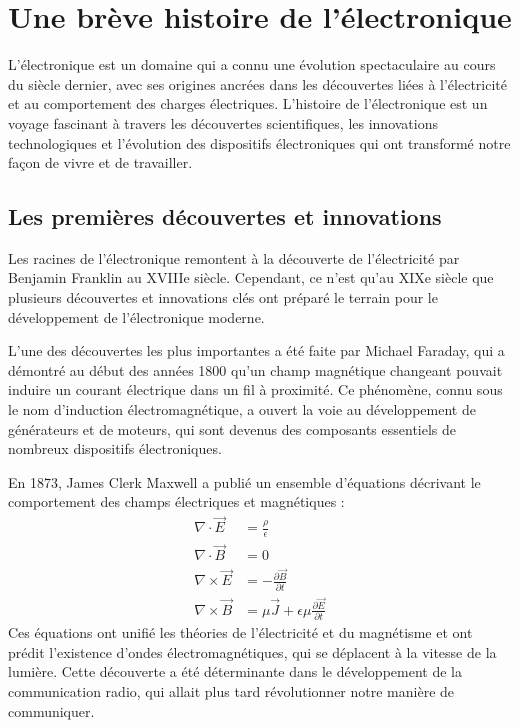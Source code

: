 \section{Une brève histoire de l'électronique}

L'électronique est un domaine qui a connu une évolution spectaculaire au cours du siècle dernier, avec ses origines ancrées dans les découvertes liées à l'électricité et au comportement des charges électriques. L'histoire de l'électronique est un voyage fascinant à travers les découvertes scientifiques, les innovations technologiques et l'évolution des dispositifs électroniques qui ont transformé notre façon de vivre et de travailler.

\subsection{Les premières découvertes et innovations}

Les racines de l'électronique remontent à la découverte de l'électricité par Benjamin Franklin au XVIIIe siècle. Cependant, ce n'est qu'au XIXe siècle que plusieurs découvertes et innovations clés ont préparé le terrain pour le développement de l'électronique moderne.

L'une des découvertes les plus importantes a été faite par Michael Faraday, qui a démontré au début des années 1800 qu'un champ magnétique changeant pouvait induire un courant électrique dans un fil à proximité. Ce phénomène, connu sous le nom d'induction électromagnétique, a ouvert la voie au développement de générateurs et de moteurs, qui sont devenus des composants essentiels de nombreux dispositifs électroniques.

En 1873, James Clerk Maxwell a publié un ensemble d'équations décrivant le comportement des champs électriques et magnétiques :
\begin{align*}
	\nabla \cdot \vec{E} &= \frac{\rho}{\epsilon} \\
	\nabla \cdot \vec{B} &= 0 \\
	\nabla \times \vec{E} &= -\frac{\partial \vec{B}}{\partial t} \\
	\nabla \times \vec{B} &= \mu \vec{J} + \epsilon \mu \frac{\partial \vec{E}}{\partial t}
\end{align*}
Ces équations ont unifié les théories de l'électricité et du magnétisme et ont prédit l'existence d'ondes électromagnétiques, qui se déplacent à la vitesse de la lumière. Cette découverte a été déterminante dans le développement de la communication radio, qui allait plus tard révolutionner notre manière de communiquer.

